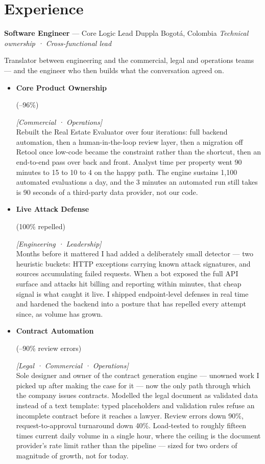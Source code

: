 \documentclass[11pt,a4paper,sans]{moderncv}
\newcommand{\impact}[1]{{\color{slate}\small #1}}
\newcommand{\metric}[1]{%
  \begingroup
  \setlength{\fboxsep}{2pt}%
  \colorbox{whisper}{\color{navy}\bfseries\strut #1}%
  \endgroup
}
\newcommand{\stakeholders}[1]{{\color{azure}\footnotesize\textsf{\textit{[#1]}}}}
\newcommand{\rolebold}[1]{{\color{navy}\bfseries #1}}
\begin{document}
\section{Experience}
\nopagebreak

%
  {\textbf{Software Engineer} --- Core Logic Lead}%
  {Duppla}%
  {Bogotá, Colombia}%
  {\textit{Technical ownership · Cross-functional lead}}{%
  Translator between engineering and the commercial, legal and operations teams --- and the engineer who then builds what the conversation agreed on.
  \begin{itemize}
    \item \rolebold{Core Product Ownership} \metric{(--96\%)} \stakeholders{Commercial · Operations}\\
      \impact{Rebuilt the Real Estate Evaluator over four iterations: full backend automation, then a human-in-the-loop review layer, then a migration off Retool once low-code became the constraint rather than the shortcut, then an end-to-end pass over back and front. Analyst time per property went 90 minutes to 15 to 10 to 4 on the happy path. The engine sustains 1,100 automated evaluations a day, and the 3 minutes an automated run still takes is 90 seconds of a third-party data provider, not our code.}
    \item \rolebold{Live Attack Defense} \metric{(100\% repelled)} \stakeholders{Engineering · Leadership}\\
      \impact{Months before it mattered I had added a deliberately small detector --- two heuristic buckets: HTTP exceptions carrying known attack signatures, and sources accumulating failed requests. When a bot exposed the full API surface and attacks hit billing and reporting within minutes, that cheap signal is what caught it live. I shipped endpoint-level defenses in real time and hardened the backend into a posture that has repelled every attempt since, as volume has grown.}
    \item \rolebold{Contract Automation} \metric{(--90\% review errors)} \stakeholders{Legal · Commercial · Operations}\\
      \impact{Sole designer and owner of the contract generation engine --- unowned work I picked up after making the case for it --- now the only path through which the company issues contracts. Modelled the legal document as validated data instead of a text template: typed placeholders and validation rules refuse an incomplete contract before it reaches a lawyer. Review errors down 90\%, request-to-approval turnaround down 40\%. Load-tested to roughly fifteen times current daily volume in a single hour, where the ceiling is the document provider's rate limit rather than the pipeline --- sized for two orders of magnitude of growth, not for today.}

\end{itemize}}
\end{document}
